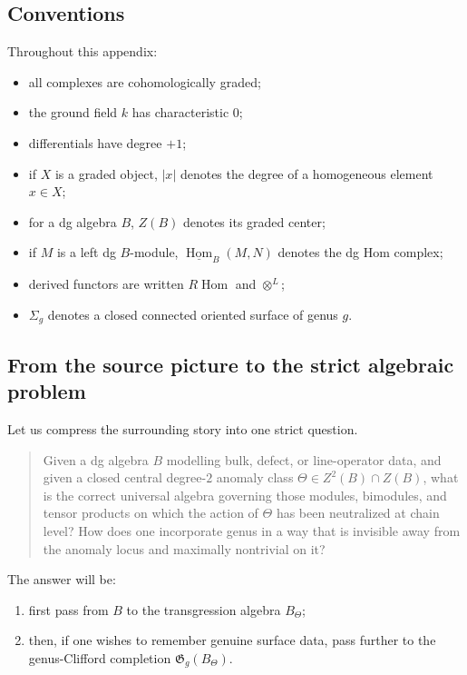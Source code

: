 \subsection{Conventions}

Throughout this appendix:
\begin{itemize}
\item all complexes are cohomologically graded;
\item the ground field \(k\) has characteristic \(0\);
\item differentials have degree \(+1\);
\item if \(X\) is a graded object, \(|x|\) denotes the degree of a homogeneous element \(x\in X\);
\item for a dg algebra \(B\), \(Z(B)\) denotes its graded center;
\item if \(M\) is a left dg \(B\)-module, \(\underline{\operatorname{Hom}}_{B}(M,N)\) denotes the dg Hom complex;
\item derived functors are written \(R\!\operatorname{Hom}\) and \(\otimes^{L}\);
\item \(\Sigma_{g}\) denotes a closed connected oriented surface of genus \(g\).
\end{itemize}

\subsection{From the source picture to the strict algebraic problem}

Let us compress the surrounding story into one strict question.

\begin{quote}
Given a dg algebra \(B\) modelling bulk, defect, or line-operator data, and given a closed central degree-\(2\) anomaly class
\(\Theta\in Z^{2}(B)\cap Z(B)\),
what is the correct universal algebra governing those modules, bimodules, and tensor products on which the action of \(\Theta\) has been neutralized at chain level?
How does one incorporate genus in a way that is invisible away from the anomaly locus and maximally nontrivial on it?
\end{quote}

The answer will be:
\begin{enumerate}
\item first pass from \(B\) to the transgression algebra \(B_{\Theta}\);
\item then, if one wishes to remember genuine surface data, pass further to the genus-Clifford completion \(\mathfrak{G}_{g}(B_{\Theta})\).
\end{enumerate}

